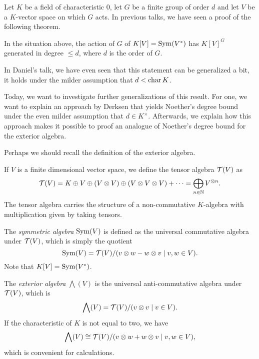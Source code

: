 \documentclass[../main.tex]{subfiles}
\begin{document}
Let $K$ be a field of characteristic $0$, let $G$ be a finite group of order $d$
and let $V$ be a $K$-vector space on which $G$ acts. In previous talks, we have 
seen a proof of the following theorem.

\begin{thm} \label{thm:classical}
    In the situation above, the action of $G$ of $K[V] = \operatorname{Sym}(V^*)$ has $K[V]^G$ generated
    in degree $\leq d$, where $d$ is the order of $G$.
\end{thm}

In Daniel's talk, we have even seen that this statement can be generalized a bit,
it holds under the milder assumption that $d < \operatorname{char} K$. 

Today, we want to investigate further generalizations of this result. 
For one, we want to explain an approach by Derksen \cite{DERKSENProofIdea} that
yields Noether's degree bound under the even milder assumption that $d \in
K^\times$. Afterwards, we explain how this approach makes it possible to
proof an analogue of Noether's degree bound for the exterior algebra.

Perhaps we should recall the definition of the exterior algebra.
\begin{defi}
    If $V$ is a finite dimensional vector space, we define the tensor algebra
    $\mathcal{T}(V)$ as 
    \begin{equation*}
        \mathcal{T}(V) = K \oplus V \oplus (V \otimes V) \oplus (V \otimes V \otimes V) + \dots
        = \bigoplus_{n \in \mathbb{N}} V^{\otimes n}.
    \end{equation*}
    The tensor algebra carries the structure of a non-commutative $K$-algebra with
    multiplication given by taking tensors. 

    The \emph{symmetric algebra} $\operatorname{Sym}(V)$ is defined as the universal
    commutative algebra under $\mathcal{T}(V)$, which is simply the quotient
    \begin{equation*}
        \operatorname{Sym}(V) = \mathcal{T}(V)/(v \otimes w - w\otimes v \mid v,w \in V).
    \end{equation*}
    Note that $K[V] = \operatorname{Sym}(V^*)$.

    The \emph{exterior algebra} $\bigwedge(V)$ is the universal anti-commutative
    algebra under $\mathcal{T}(V)$, which is 
    \begin{equation*}
        \bigwedge(V) = \mathcal{T}(V)/(v \otimes v \mid v \in V).
    \end{equation*}
    If the characteristic of $K$ is not equal to two, we have
    \begin{equation*}
        \bigwedge(V) \cong \mathcal{T}(V)/(v \otimes w + w \otimes v \mid v,w \in V),
    \end{equation*}
    which is convenient for calculations.
\end{defi}
\end{document}
